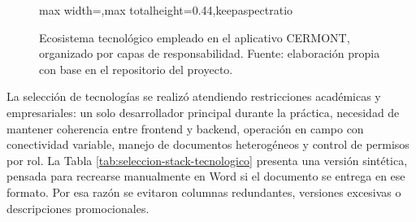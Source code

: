 \begin{figure}[!htbp]
\centering
\begin{adjustbox}{max width=\textwidth,max totalheight=0.44\textheight,keepaspectratio}

\end{adjustbox}
\caption{Ecosistema tecnológico empleado en el aplicativo CERMONT, organizado por capas de responsabilidad. Fuente: elaboración propia con base en el repositorio del proyecto.}
\label{fig:ecosistema-tecnologico-cermont}
\end{figure}

La selección de tecnologías se realizó atendiendo restricciones académicas y empresariales: un solo desarrollador principal durante la práctica, necesidad de mantener coherencia entre frontend y backend, operación en campo con conectividad variable, manejo de documentos heterogéneos y control de permisos por rol. La Tabla \ref{tab:seleccion-stack-tecnologico} presenta una versión sintética, pensada para recrearse manualmente en Word si el documento se entrega en ese formato. Por esa razón se evitaron columnas redundantes, versiones excesivas o descripciones promocionales.

